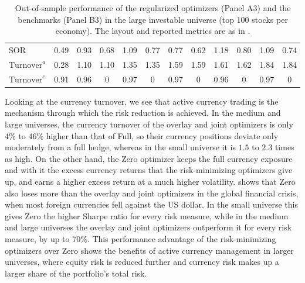 \begin{table}[bp]
{\begin{tabular}{l*{11}{c}}
    SOR                      & 0.49             & 0.93             & 0.68             & 1.09             & 0.77             & 0.77             & 0.62             & 1.18             & 0.80             & 1.09             & 0.74 \\
    $\text{Turnover}^a$      & 0.28             & 1.10             & 1.10             & 1.35             & 1.35             & 1.59             & 1.59             & 1.61             & 1.62             & 1.84             & 1.84 \\
    $\text{Turnover}^c$      & 0.91             & 0.96             & 0                & 0.97             & 0                & 0.97             & 0                & 0.96             & 0                & 0.97             & 0 \\
    \bottomrule
  \end{tabular}%
}
  \caption{Out-of-sample performance of the regularized optimizers (Panel A3) and the benchmarks (Panel B3) in the large investable universe (top 100 stocks per economy). The layout and reported metrics are as in .}
  \label{tab:regularized-top100}
\end{table}

Looking at the currency turnover, we see that active currency trading is the mechanism through which
the risk reduction is achieved.
In the medium and large universes, the currency turnover of the overlay and joint optimizers is
only $4\%$ to $46\%$ higher than that of Full, so their currency positions deviate only moderately from a full hedge,
whereas in the small universe it is $1.5$ to $2.3$ times as high. 
On the other hand, the Zero optimizer keeps the full currency 
exposure and with it the excess currency returns that the
risk-minimizing optimizers give up, and earns a higher excess return at a much higher volatility.  shows that Zero also loses more than
the overlay and joint optimizers in the global financial crisis, when most foreign currencies fell against the US dollar. In the small universe
this gives Zero the higher Sharpe ratio for every risk measure, while in the medium and large universes the overlay and
joint optimizers outperform it for every risk measure, by up to 70\%. This performance advantage of the risk-minimizing optimizers over Zero shows the
benefits of active currency management in larger universes, where equity risk is
reduced further and currency risk makes up a larger share of the portfolio's
total risk.

